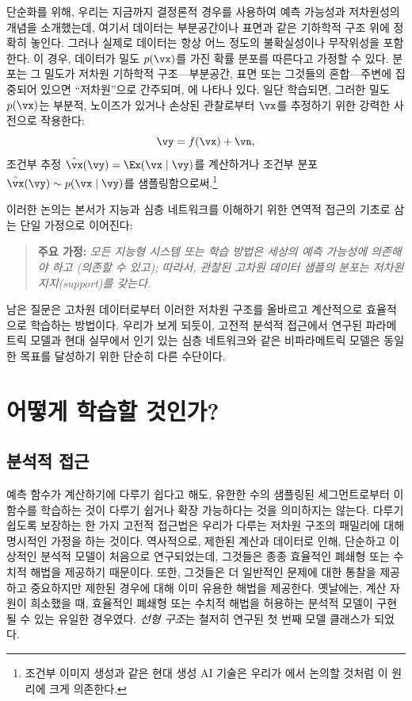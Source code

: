 \documentclass[../../book-main_ko.tex]{subfiles}
\begin{document}
단순화를 위해, 우리는 지금까지 결정론적 경우를 사용하여 예측 가능성과 저차원성의 개념을 소개했는데, 여기서 데이터는 부분공간이나 표면과 같은 기하학적 구조 위에 정확히 놓인다. 그러나 실제로 데이터는 항상 어느 정도의 불확실성이나 무작위성을 포함한다. 이 경우, 데이터가 밀도 \(p(\vx)\)를 가진 확률 분포를 따른다고 가정할 수 있다. 분포는 그 밀도가 저차원 기하학적 구조---부분공간, 표면 또는 그것들의 혼합---주변에 집중되어 있으면 ``저차원''으로 간주되며, 에 나타나 있다. 일단 학습되면, 그러한 밀도 \(p(\vx)\)는 부분적, 노이즈가 있거나 손상된 관찰로부터 \(\vx\)를 추정하기 위한 강력한 사전으로 작용한다:
\begin{equation}
    \vy = f(\vx) + \vn,
    \label{eqn:noisy-observation}
\end{equation}
조건부 추정 \(\hat{\vx}(\vy) = \Ex(\vx \mid \vy)\)를 계산하거나 조건부 분포 \(\hat{\vx}(\vy) \sim p(\vx\mid \vy)\)를 샘플링함으로써.\footnote{조건부 이미지 생성과 같은 현대 생성 AI 기술은 우리가 에서 논의할 것처럼 이 원리에 크게 의존한다.}

이러한 논의는 본서가 지능과 심층 네트워크를 이해하기 위한 연역적 접근의 기초로 삼는 단일 가정으로 이어진다:
\begin{quote}
\textbf{주요 가정:} \textit{모든 지능형 시스템 또는 학습 방법은 세상의 예측 가능성에 의존해야 하고 (의존할 수 있고); 따라서, 관찰된 고차원 데이터 샘플의 분포는 저차원 지지(support)를 갖는다.}
\end{quote}
남은 질문은 고차원 데이터로부터 이러한 저차원 구조를 올바르고 계산적으로 효율적으로 학습하는 방법이다. 우리가 보게 되듯이, 고전적 분석적 접근에서 연구된 파라메트릭 모델과 현대 실무에서 인기 있는 심층 네트워크와 같은 비파라메트릭 모델은 동일한 목표를 달성하기 위한 단순히 다른 수단이다.


\section{어떻게 학습할 것인가?}


\subsection{분석적 접근}
\label{sec:analytical}
예측 함수가 계산하기에 다루기 쉽다고 해도, 유한한 수의 샘플링된 세그먼트로부터 이 함수를 학습하는 것이 다루기 쉽거나 확장 가능하다는 것을 의미하지는 않는다. 다루기 쉽도록 보장하는 한 가지 고전적 접근법은 우리가 다루는 저차원 구조의 패밀리에 대해 명시적인 가정을 하는 것이다. 역사적으로, 제한된 계산과 데이터로 인해, 단순하고 이상적인 분석적 모델이 처음으로 연구되었는데, 그것들은 종종 효율적인 폐쇄형 또는 수치적 해법을 제공하기 때문이다. 또한, 그것들은 더 일반적인 문제에 대한 통찰을 제공하고 중요하지만 제한된 경우에 대해 이미 유용한 해법을 제공한다. 옛날에는, 계산 자원이 희소했을 때, 효율적인 폐쇄형 또는 수치적 해법을 허용하는 분석적 모델이 구현될 수 있는 유일한 경우였다. \textit{선형 구조}는 철저히 연구된 첫 번째 모델 클래스가 되었다.
\end{document}
